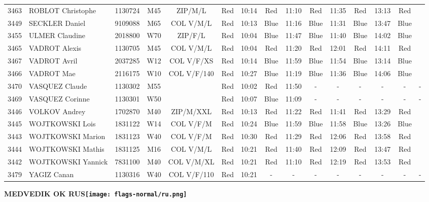 \documentclass{report}
\begin{document}
\begin{longtable}{|c|l|r|c|c|*{5}{cc|}}
    3463 & ROBLOT Christophe & 1130724 & M45 & ZIP/M/L & Red & 10:14 & Red & 11:10 & Red & 11:35 & Red & 13:13 & Red &  \\
    3449 & SECKLER Daniel & 9109088 & M65 & COL V/M/L & Red & 10:13 & Blue & 11:16 & Blue & 11:31 & Blue & 13:47 & Blue &  \\
    3455 & ULMER Claudine & 2018800 & W70 & ZIP/F/L & Red & 10:04 & Blue & 11:47 & Blue & 11:40 & Blue & 14:02 & Blue &  \\
    3465 & VADROT Alexis & 1130705 & M45 & COL V/M/L & Red & 10:04 & Red & 11:20 & Red & 12:01 & Red & 14:11 & Red &  \\
    3467 & VADROT Avril & 2037285 & W12 & COL V/F/XS & Red & 10:14 & Blue & 11:59 & Blue & 11:54 & Blue & 13:14 & Blue &  \\
    3466 & VADROT Mae & 2116175 & W10 & COL V/F/140 & Red & 10:27 & Blue & 11:19 & Blue & 11:36 & Blue & 14:06 & Blue &  \\
    3470 & VASQUEZ Claude & 1130302 & M55 &   & Red & 10:02 & Red & 11:50 & - &  - & - &  - & - &  -\\
    3469 & VASQUEZ Corinne & 1130301 & W50 &   & Red & 10:07 & Blue & 11:09 & - &  - & - &  - & - &  -\\
    3446 & VOLKOV Andrey & 1702870 & M40 & ZIP/M/XXL & Red & 10:13 & Red & 11:22 & Red & 11:41 & Red & 13:29 & Red &  \\
    3445 & WOJTKOWSKI Lois & 1831122 & W14 & COL V/F/M & Red & 10:24 & Blue & 11:59 & Blue & 11:58 & Blue & 13:26 & Blue &  \\
    3443 & WOJTKOWSKI Marion & 1831123 & W40 & COL V/F/M & Red & 10:30 & Red & 11:29 & Red & 12:06 & Red & 13:58 & Red &  \\
    3444 & WOJTKOWSKI Mathis & 1831125 & M16 & COL V/M/L & Red & 10:21 & Red & 11:40 & Red & 12:09 & Red & 13:47 & Red &  \\
    3442 & WOJTKOWSKI Yannick & 7831100 & M40 & COL V/M/XL & Red & 10:21 & Red & 11:10 & Red & 12:19 & Red & 13:53 & Red &  \\
    3479 & YAGIZ Canan & 1130316 & W40 & COL V/F/110 & Red & 10:21 & - &  - & - &  - & - &  - & - &  -\\
  \end{longtable}
\newpage
  \Huge \centering \bfseries MEDVEDIK OK  RUS\normalfont \footnotesize \sffamily \hfill \texttt{[image: flags-normal/ru.png]} \newline 
\end{document}
